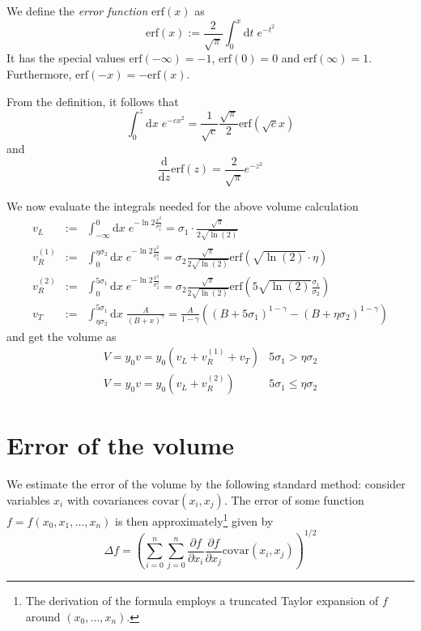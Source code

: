 \documentclass[a4paper]{article}
\newcommand{\erf}{\mathrm{erf}}
\newcommand{\D}[2]{\frac{\partial #1}{\partial #2}}
\begin{document}
We define the \textit{error function} $\erf(x)$ as
\begin{equation}
\erf(x) := \frac{2}{\sqrt{\pi}}\int_0^{x}\mathrm{d}t\;e^{-t^2}
\end{equation}
It has the special values $\erf(-\infty) = -1$, $\erf(0) = 0$ and $\erf(\infty) = 1$. Furthermore, $\erf(-x) = -\erf(x)$.

From the definition, it follows that
\begin{equation}
\int_{0}^{z}\mathrm{d}x\; e^{-cx^2} = \frac{1}{\sqrt{c}} \frac{\sqrt{\pi}}{2} \erf(\sqrt{c} x)
\end{equation}
and
\begin{equation}
\frac{\mathrm{d}}{\mathrm{d}z}\erf(z) = \frac{2}{\sqrt{\pi}} e^{-z^2}
\end{equation}

We now evaluate the integrals needed for the above volume calculation
\begin{eqnarray}
v_L &:=& \int_{-\infty}^0 \mathrm{d}x\; e^{-\ln 2 \frac{x^2}{\sigma_1^2}} = \sigma_1 \cdot \frac{\sqrt{\pi}}{2 \sqrt{\ln(2)}}\\
v_R^{(1)} &:=& \int_0^{\eta\sigma_2}\mathrm{d}x\;e^{-\ln 2 \frac{x^2}{\sigma_2^2}}
= \sigma_2 \frac{\sqrt{\pi}}{2 \sqrt{\ln(2)}} \erf(\sqrt{\ln(2)}\cdot\eta)\\
v_R^{(2)} &:=& \int_0^{5\sigma_1}\mathrm{d}x\;e^{-\ln 2 \frac{x^2}{\sigma_2^2}}
= \sigma_2 \frac{\sqrt{\pi}}{2 \sqrt{\ln(2)}} \erf(5\sqrt{\ln(2)}\frac{\sigma_1}{\sigma_2})\\
v_T &:=& \int_{\eta\sigma_2}^{5 \sigma_1}\mathrm{d}x\;\frac{A}{(B + x)^\gamma}
= \frac{A}{1-\gamma}\left((B + 5\sigma_1)^{1-\gamma} - (B + \eta\sigma_2)^{1-\gamma}\right)
\end{eqnarray}
and get the volume as
\begin{equation}
\begin{array}{ll}
V = y_0 v = y_0 (v_L + v_R^{(1)} + v_T) & 5\sigma_1 > \eta\sigma_2\\
V = y_0 v = y_0 (v_L + v_R^{(2)}) & 5\sigma_1 \le \eta\sigma_2
\end{array}
\end{equation}

\section{Error of the volume}
We estimate the error of the volume by the following standard method: consider variables $x_i$ with covariances $\mathrm{covar}(x_i, x_j)$. The error of some function $f = f(x_0, x_1, \ldots, x_n)$ is then approximately\footnote{The derivation of the formula employs a truncated Taylor expansion of $f$ around $(x_0, \ldots, x_n)$.} given by
\begin{equation}
\Delta f = \left( \sum_{i=0}^n \sum_{j=0}^n \D{f}{x_i} \D{f}{x_j} \mathrm{covar}(x_i, x_j) \right)^{1/2}
\end{equation}
\end{document}
